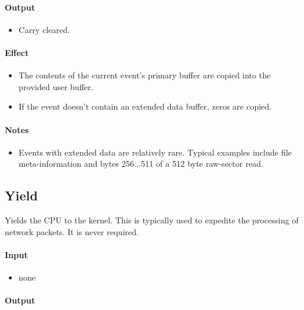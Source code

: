 \paragraph{Output}

\begin{itemize}
\item Carry cleared.
\end{itemize}

\paragraph{Effect}

\begin{itemize}
\item The contents of the current event's primary buffer are copied into the provided user buffer.
\item If the event doesn't contain an extended data buffer, zeros are copied.
\end{itemize}

\paragraph{Notes}

\begin{itemize}
\item Events with extended data are relatively rare.  Typical examples include file meta-information and bytes 256...511 of a 512 byte raw-sector read. 
\end{itemize}


\subsection*{Yield}

Yields the CPU to the kernel.  This is typically used to expedite the processing of network packets.  It is never required.

\paragraph{Input}

\begin{itemize}
\item none
\end{itemize}

\paragraph{Output}

